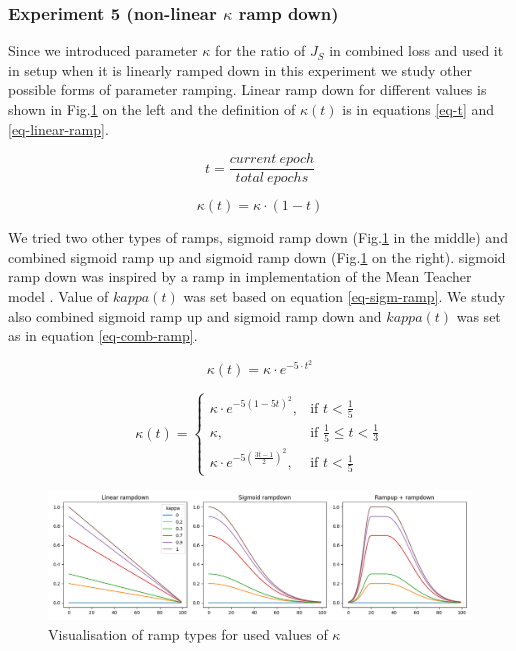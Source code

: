 \subsubsection{Experiment 5 (non-linear $\kappa$ ramp down)}

Since we introduced parameter $\kappa$ for the ratio of $J_S$ in combined loss and used it in setup when it is linearly ramped down in this experiment we study other possible forms of parameter ramping. Linear ramp down for different values is shown in Fig.\ref{fig:ramps} on the left and the definition of $\kappa(t)$ is in equations \ref{eq-t} and \ref{eq-linear-ramp}.

\begin{equation}
    t = \frac{current\ epoch}{total\ epochs}
    \label{eq-t}
\end{equation}

\begin{equation}
    \kappa(t) = \kappa \cdot (1 - t) 
    \label{eq-linear-ramp}
\end{equation}

We tried two other types of ramps, sigmoid ramp down (Fig.\ref{fig:ramps} in the middle) and combined sigmoid ramp up and sigmoid ramp down (Fig.\ref{fig:ramps} on the right). sigmoid ramp down was inspired by a ramp in implementation of the Mean Teacher model \cite{curiousai}. Value of $kappa(t)$ was set based on equation \ref{eq-sigm-ramp}. We study also combined sigmoid ramp up and sigmoid ramp down and $kappa(t)$ was set as in equation \ref{eq-comb-ramp}.

\begin{equation}
    \kappa(t) = \kappa \cdot e^{-5 \cdot t^2}
    \label{eq-sigm-ramp}
\end{equation}

\begin{equation}
    \kappa(t) = \begin{cases}
		      \kappa \cdot e^{-5  (1-5t)^2}, & \text{if $t < \frac{1}{5}$ }\\
            \kappa, & \text{if $\frac{1}{5} \leq t < \frac{1}{3}$}\\
            \kappa \cdot e^{-5  (\frac{3t - 1}{2})^2}, & \text{if $t < \frac{1}{5}$ }
		 \end{cases}
    \label{eq-comb-ramp}
\end{equation}




\begin{figure}[h!]
    \centering
    \includegraphics[width=1\textwidth]{figs/ramps.png}
    \caption{Visualisation of ramp types for used values of $\kappa$}
    \label{fig:ramps}
\end{figure}


